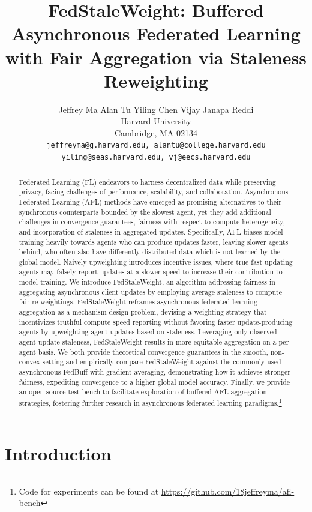 \documentclass{article}
\title{FedStaleWeight: Buffered Asynchronous Federated Learning with Fair Aggregation via Staleness Reweighting}
\author{%
  Jeffrey Ma \quad Alan Tu \quad Yiling Chen \quad Vijay Janapa Reddi\\
  Harvard University\\
  Cambridge, MA 02134 \\
  \texttt{jeffreyma@g.harvard.edu, alantu@college.harvard.edu} \\
  \texttt{yiling@seas.harvard.edu, vj@eecs.harvard.edu}
}
\begin{document}
\maketitle

\begin{abstract}
Federated Learning (FL) endeavors to harness decentralized data while preserving privacy, facing challenges of performance, scalability, and collaboration. Asynchronous Federated Learning (AFL) methods have emerged as promising alternatives to their synchronous counterparts bounded by the slowest agent, yet they add additional challenges in convergence guarantees, fairness with respect to compute heterogeneity, and incorporation of staleness in aggregated updates. Specifically, AFL biases model training heavily towards agents who can produce updates faster, leaving slower agents behind, who often also have differently distributed data which is not learned by the global model. Naively upweighting introduces incentive issues, where true fast updating agents may falsely report updates at a slower speed to increase their contribution to model training. We introduce FedStaleWeight, an algorithm addressing fairness in aggregating asynchronous client updates by employing average staleness to compute fair re-weightings. FedStaleWeight reframes asynchronous federated learning aggregation as a mechanism design problem, devising a weighting strategy that incentivizes truthful compute speed reporting without favoring faster update-producing agents by upweighting agent updates based on staleness. Leveraging only observed agent update staleness, FedStaleWeight results in more equitable aggregation on a per-agent basis. We both provide theoretical convergence guarantees in the smooth, non-convex setting and empirically compare FedStaleWeight against the commonly used asynchronous FedBuff with gradient averaging, demonstrating how it achieves stronger fairness, expediting convergence to a higher global model accuracy. Finally, we provide an open-source test bench to facilitate exploration of buffered AFL aggregation strategies, fostering further research in asynchronous federated learning paradigms.\footnote{Code for experiments can be found at \href{https://github.com/18jeffreyma/afl-bench}{https://github.com/18jeffreyma/afl-bench}}
\end{abstract}

\section{Introduction}
\end{document}
